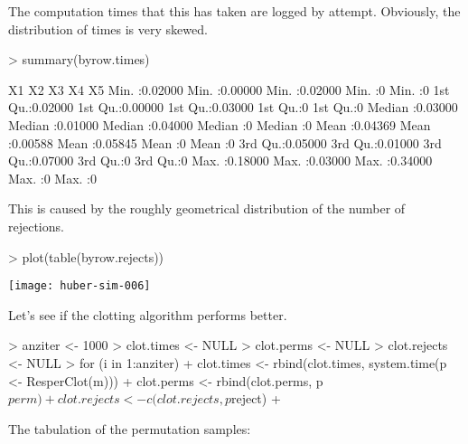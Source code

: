 \documentclass{scrartcl}
\begin{document}
The computation times that this has taken are logged by attempt. Obviously, the distribution of times is very skewed. 

\begin{Schunk}
\begin{Sinput}
> summary(byrow.times)
\end{Sinput}
\begin{Soutput}
       X1                X2                X3                X4          X5   
 Min.   :0.02000   Min.   :0.00000   Min.   :0.02000   Min.   :0   Min.   :0  
 1st Qu.:0.02000   1st Qu.:0.00000   1st Qu.:0.03000   1st Qu.:0   1st Qu.:0  
 Median :0.03000   Median :0.01000   Median :0.04000   Median :0   Median :0  
 Mean   :0.04369   Mean   :0.00588   Mean   :0.05845   Mean   :0   Mean   :0  
 3rd Qu.:0.05000   3rd Qu.:0.01000   3rd Qu.:0.07000   3rd Qu.:0   3rd Qu.:0  
 Max.   :0.18000   Max.   :0.03000   Max.   :0.34000   Max.   :0   Max.   :0  
\end{Soutput}
\end{Schunk}

This is caused by the roughly geometrical distribution of the number of rejections. 

\begin{Schunk}
\begin{Sinput}
> plot(table(byrow.rejects))
\end{Sinput}
\end{Schunk}
\texttt{[image: huber-sim-006]}

Let's see if the clotting algorithm performs better.

\begin{Schunk}
\begin{Sinput}
> anziter <- 1000
> clot.times <- NULL
> clot.perms <- NULL
> clot.rejects <- NULL
> for (i in 1:anziter) {
+     clot.times <- rbind(clot.times, system.time(p <- ResperClot(m)))
+     clot.perms <- rbind(clot.perms, p$perm)
+     clot.rejects <- c(clot.rejects, p$reject)
+ }
\end{Sinput}
\end{Schunk}

The tabulation of the permutation samples:
\end{document}
